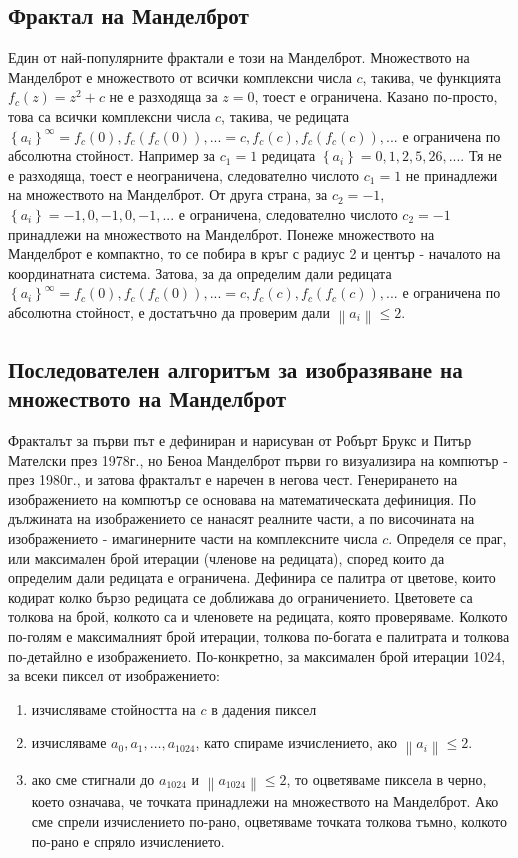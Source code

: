 \documentclass[a4paper,11pt]{article}
\begin{document}
\subsection{Фрактал на Манделброт}
Един от най-популярните фрактали е този на Манделброт. Множеството на Манделброт е множеството от всички комплексни числа $c$, такива, че функцията $f_c(z)=z^2+c$ не е разходяща за $z=0$, тоест е ограничена. Казано по-просто, това са всички комплексни числа $c$, такива, че редицата $\left\{a_i\right\}^\infty=f_c(0), f_c(f_c(0)), ... = c, f_c(c), f_c(f_c(c)), ...$ е ограничена по абсолютна стойност. 
Например за $c_1=1$ редицата $\left\{a_i\right\}=0, 1, 2, 5, 26, ...$. Тя не е разходяща, тоест е неограничена, следователно числото $c_1=1$ не принадлежи на множеството на Манделброт. 
От друга страна, за $c_2=-1$, $\left\{a_i\right\}=-1, 0, -1, 0, -1, ...$ е ограничена, следователно числото $c_2=-1$ принадлежи на множеството на Манделброт. 
Понеже множеството на Манделброт е компактно, то се побира в кръг с радиус 2 и център - началото на координатната система. Затова, за да определим дали редицата $\left\{a_i\right\}^\infty=f_c(0), f_c(f_c(0)), ... = c, f_c(c), f_c(f_c(c)), ...$ е ограничена по абсолютна стойност, е достатъчно да проверим дали $\left\|a_i\right\|\leq 2$. 
\subsection{Последователен алгоритъм за изобразяване на множеството на Манделброт}
Фракталът за първи път е дефиниран и нарисуван от Робърт Брукс и Питър Мателски през 1978г., но Беноа Манделброт първи го визуализира на компютър - през 1980г., и затова фракталът е наречен в негова чест. 
Генерирането на изображението на компютър се основава на математическата дефиниция. По дължината на изображението се нанасят реалните части, а по височината на изображението - имагинерните части на комплексните числа $c$. Определя се праг, или максимален брой итерации (членове на редицата), според които да определим дали редицата е ограничена. Дефинира се палитра от цветове, които кодират колко бързо редицата се доближава до ограничението. Цветовете са толкова на брой, колкото са и членовете на редицата, която проверяваме. Колкото по-голям е максималният брой итерации, толкова по-богата е палитрата и толкова по-детайлно е изображението. 
По-конкретно, за максимален брой итерации 1024, за всеки пиксел от изображението:
\begin{enumerate}
    \item изчисляваме стойността на $c$ в дадения пиксел
    \item изчисляваме $a_0, a_1,\dots, a_{1024}$, като спираме изчислението, ако $\left\|a_i\right\|\leq 2$. 
    \item ако сме стигнали до $a_{1024}$ и $\left\|a_{1024}\right\|\leq 2$, то оцветяваме пиксела в черно, което означава, че точката принадлежи на множеството на Манделброт. Ако сме спрели изчислението по-рано, оцветяваме точката толкова тъмно, колкото по-рано е спряло изчислението. 
\end{enumerate}
\end{document}
